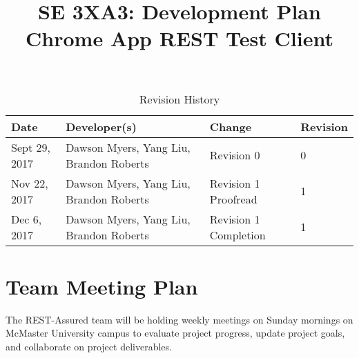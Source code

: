 \documentclass{article}
\title{SE 3XA3: Development Plan\\Chrome App REST Test Client}
\begin{document}






\def\thesection{\arabic{section}} 
\renewcommand\thesection{\arabic{section}} 
\renewcommand\thesubsection{\thesection.\arabic{subsection}}

\tableofcontents

\listoftables

\listoffigures


\newpage



\begin{table}[hp]
\caption{Revision History} \label{TblRevisionHistory}
\begin{tabularx}{\textwidth}{lXlX}
\toprule
\textbf{Date} & \textbf{Developer(s)} & \textbf{Change} & \textbf{Revision}\\
\midrule
Sept​ ​29,​ ​2017 & Dawson Myers, Yang Liu, Brandon Roberts & Revision​ ​0 & 0\\
\hline
Nov​ ​22,​ ​2017 & Dawson Myers, Yang Liu, Brandon Roberts & Revision​ ​1 Proofread & 1\\
\hline
Dec 6,​ ​2017 & Dawson Myers, Yang Liu, Brandon Roberts & Revision​ ​1 Completion & 1\\
\hline
\bottomrule
\end{tabularx}
\end{table}




\section{Team Meeting Plan}
The REST-Assured team will be holding weekly meetings on Sunday mornings on McMaster University campus to evaluate project progress, update project goals, and collaborate on project deliverables. 
\end{document}
